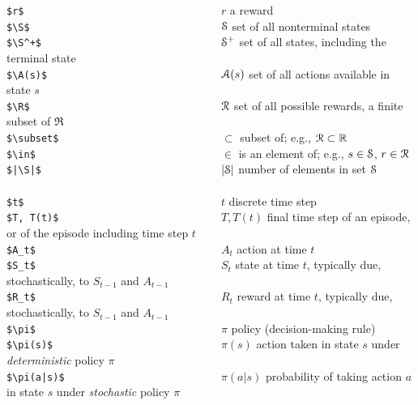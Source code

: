 \documentclass[10pt,fleqn]{article}
\begin{document}
\begin{tabbing}
\>\verb+$r$                                  +\>$r$                 \> a reward\\
\>\verb+$\S$                                 +\>$\S$                \> set of all nonterminal states \\
\>\verb|$\S^+$                               |\>$\S^+$              \> set of all states, including the terminal state \\
\>\verb+$\A(s)$                              +\>$\A(s)$             \> set of all actions available in state $s$\\
\>\verb+$\R$                                 +\>$\R$                \> set of all possible rewards, a finite subset of $\Re$\\
\>\verb+$\subset$                            +\>$\subset$           \> subset of; e.g., $\R\subset\Re$\\
\>\verb+$\in$                                +\>$\in$               \> is an element of; e.g., $s\in\S$, $r\in\R$\\
\>\verb+$|\S|$                               +\>$|\S|$              \> number of elements in set $\S$\\
\\
\>\verb+$t$                                  +\>$t$                 \> discrete time step\\
\>\verb+$T, T(t)$                            +\>$T, T(t)$           \> final time step of an episode, or of the episode including time step $t$\\ 
\>\verb+$A_t$                                +\>$A_t$               \> action at time $t$\\
\>\verb+$S_t$                                +\>$S_t$               \> state at time $t$, typically due, stochastically, to $S_{t-1}$ and $A_{t-1}$\\
\>\verb+$R_t$                                +\>$R_t$               \> reward at time $t$, typically due, stochastically, to $S_{t-1}$ and $A_{t-1}$\\
\>\verb+$\pi$                                +\>$\pi$               \> policy (decision-making rule)\\
\>\verb+$\pi(s)$                             +\>$\pi(s)$            \> action taken in state $s$ under {\it deterministic\/} policy $\pi$\\
\>\verb+$\pi(a|s)$                           +\>$\pi(a|s)$          \> probability of taking action $a$ in state $s$ under {\it stochastic\/} policy $\pi$\\
\\

\end{tabbing}
\end{document}
